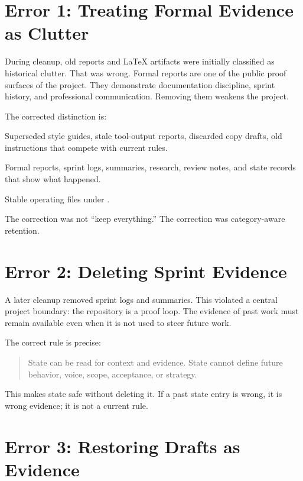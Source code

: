 \documentclass[a4paper,11pt,openany]{report}
\newcommand{\safePath}[1]{\texttt{\detokenize{#1}}}
\begin{document}
\section{Error 1: Treating Formal Evidence as Clutter}

During cleanup, old reports and LaTeX artifacts were initially classified as
historical clutter. That was wrong. Formal reports are one of the public proof
surfaces of the project. They demonstrate documentation discipline, sprint
history, and professional communication. Removing them weakens the project.

The corrected distinction is:

\begin{description}[style=nextline]
  \item[Context poison]
    Superseded style guides, stale tool-output reports, discarded copy drafts,
    old instructions that compete with current rules.

  \item[Evidence]
    Formal reports, sprint logs, summaries, research, review notes, and state
    records that show what happened.

  \item[Current authority]
    Stable operating files under \safePath{agents/rules/}.
\end{description}

The correction was not ``keep everything.'' The correction was category-aware
retention.

\section{Error 2: Deleting Sprint Evidence}

A later cleanup removed sprint logs and summaries. This violated a central
project boundary: the repository is a proof loop. The evidence of past work must
remain available even when it is not used to steer future work.

The correct rule is precise:

\begin{quote}
State can be read for context and evidence. State cannot define future behavior,
voice, scope, acceptance, or strategy.
\end{quote}

This makes state safe without deleting it. If a past state entry is wrong, it is
wrong evidence; it is not a current rule.

\section{Error 3: Restoring Drafts as Evidence}
\end{document}
